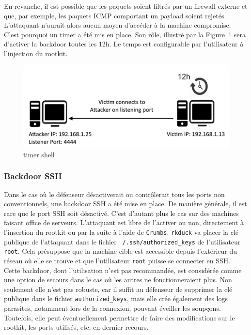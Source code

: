 \documentclass[12pt]{article}
\begin{document}
    En revanche, il est possible que les paquets soient filtrés par un firewall externe et que, par exemple, les paquets ICMP comportant un payload soient rejetés. L'attaquant n'aurait alors aucun moyen d'accéder à la machine compromise. C'est pourquoi un timer a été mis en place. Son rôle, illustré par la Figure~\ref{figure:4} sera d'activer la backdoor toutes les 12h. Le temps est configurable par l'utilisateur à l'injection du rootkit.
        
\begin{figure}[H] 
\begin{center}
\includegraphics{./img/timer-shell.png}

\caption[dsfsdf]{timer shell}
\label{figure:4}
\end{center}
\end{figure}
                    
            
        \subsubsection{Backdoor SSH}
        
        	Dans le cas où le défenseur désactiverait ou contrôlerait tous les ports non conventionnels, une backdoor SSH a été mise en place. De manière générale, il est rare que le port SSH soit désactivé. C'est d'autant plus le cas sur des machines faisant office de serveurs. L'attaquant est libre de l'activer ou non, directement à l'insertion du rootkit ou par la suite à l'aide de \texttt{Crumbs}. \texttt{rkduck} va placer la clé publique de l'attaquant dans le fichier \texttt{~/.ssh/authorized\_keys} de l'utilisateur \texttt{root}. Cela présuppose que la machine cible est accessible depuis l'extérieur du réseau où elle se trouve et que l'utilisateur \texttt{root} puisse se connecter en SSH. \\
            
            Cette backdoor, dont l'utilisation n'est pas recommandée, est considérée comme une option de secours dans le cas où les autres ne fonctionneraient plus. Non seulement elle n'est pas robuste, car il suffit au défenseur de supprimer la clé publique dans le fichier \texttt{authorized\_keys}, mais elle crée également des logs parasites, notamment lors de la connexion, pouvant éveiller les soupçons. Toutefois, elle peut éventuellement permettre de faire des modifications sur le rootkit, les ports utilisés, etc. en dernier recours.  
\end{document}
